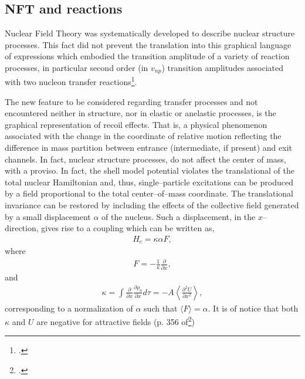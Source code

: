 \begin{subappendices}
\section{NFT and reactions}\label{App1.D}
Nuclear Field Theory was systematically developed to describe nuclear structure processes. This fact did not prevent the translation into this graphical language of expressions which embodied the transition amplitude of a variety of reaction processes, in particular second order (in $v_{np}$) transition amplitudes associated with two nucleon transfer reactions\footnote{\cite{Broglia:75}.}.


The new feature to be considered regarding transfer processes and not encountered neither in structure, nor in elastic or anelastic processes, is the graphical representation of recoil effects. That is, a physical phenomenon associated with the change in the coordinate of relative motion reflecting the difference in mass partition between entrance (intermediate, if present) and exit channels. In fact, nuclear structure processes, do not affect the center of mass, with a proviso. In fact, the shell model potential violates the translational of the total nuclear Hamiltonian and, thus, single--particle excitations can be produced by a field proportional to the total center--of--mass coordinate. The translational invariance can be restored by including  the effects of the collective field generated by a small displacement $\alpha$ of the nucleus. Such a displacement, in the $x$--direction, gives rise to a coupling which can be written as,
\begin{align}\label{eq1.D.1}
H_{c}=\kappa\alpha F,
\end{align}
where 
\begin{align}\label{eq1.D.2}
F=-\frac{1}{\kappa}\frac{\partial}{\partial x},
\end{align}
and
\begin{align}\label{eq1.D.3}
\kappa=\int\frac{\partial}{\partial x}\frac{\partial \rho_0}{\partial x}d\tau=-A\left\langle\frac{\partial^2U}{\partial x^2}\right\rangle,
\end{align}
corresponding to a normalization of $\alpha$ such that $\langle F\rangle=\alpha$. It is of notice that both $\kappa$ and $U$ are negative for attractive fields (p. 356 of\footnote{\cite{Bohr:75}.})



\end{subappendices}
